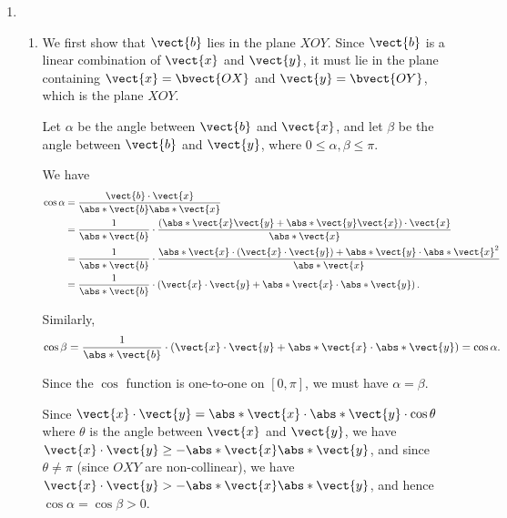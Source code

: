 \Question{\currfilebase}

\begin{enumerate}
    \item \begin{enumerate}
              \item We first show that \(\vect{b}\) lies in the plane \(XOY\). Since \(\vect{b}\) is a linear combination of \(\vect{x}\) and \(\vect{y}\), it must lie in the plane containing \(\vect{x} = \bvect{OX}\) and \(\vect{y} = \bvect{OY}\), which is the plane \(XOY\).

                    Let \(\alpha\) be the angle between \(\vect{b}\) and \(\vect{x}\), and let \(\beta\) be the angle between \(\vect{b}\) and \(\vect{y}\), where \(0 \leq \alpha, \beta \leq \pi\).

                    We have
                    \begin{align*}
                        \cos \alpha & = \frac{\vect{b} \cdot \vect{x}}{\abs*{\vect{b}} \abs*{\vect{x}}}                                                                                              \\
                                    & = \frac{1}{\abs*{\vect{b}}} \cdot \frac{\left(\abs*{\vect{x}} \vect{y} + \abs*{\vect{y}} \vect{x}\right) \cdot \vect{x}}{\abs*{\vect{x}}}                      \\
                                    & = \frac{1}{\abs*{\vect{b}}} \cdot \frac{\abs*{\vect{x}} \cdot \left(\vect{x} \cdot \vect{y}\right) + \abs*{\vect{y}} \cdot \abs*{\vect{x}}^2}{\abs*{\vect{x}}} \\
                                    & = \frac{1}{\abs*{\vect{b}}} \cdot \left(\vect{x} \cdot \vect{y} + \abs*{\vect{x}} \cdot \abs*{\vect{y}}\right).
                    \end{align*}

                    Similarly,
                    \[
                        \cos \beta = \frac{1}{\abs*{\vect{b}}} \cdot \left(\vect{x} \cdot \vect{y} + \abs*{\vect{x}} \cdot \abs*{\vect{y}}\right) = \cos \alpha.
                    \]

                    Since the \(\cos\) function is one-to-one on \([0, \pi]\), we must have \(\alpha = \beta\).

                    Since \(\vect{x} \cdot \vect{y} = \abs*{\vect{x}} \cdot \abs*{\vect{y}} \cdot \cos \theta\) where \(\theta\) is the angle between \(\vect{x}\) and \(\vect{y}\), we have \(\vect{x} \cdot \vect{y} \geq - \abs*{\vect{x}} \abs*{\vect{y}}\), and since \(\theta \neq \pi\) (since \(OXY\) are non-collinear), we have \(\vect{x} \cdot \vect{y} > - \abs*{\vect{x}} \abs*{\vect{y}}\), and hence \(\cos \alpha = \cos \beta > 0\).


\end{enumerate}
\end{enumerate}
